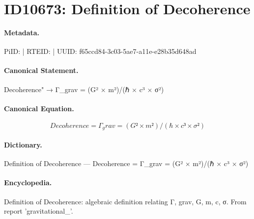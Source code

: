 \section*{ID10673: Definition of Decoherence}
\paragraph{Metadata.}
PiID:  | RTEID:  | UUID: f65ccd84-3c03-5ae7-a11e-e28b35d648ad

\paragraph{Canonical Statement.}
Decoherence" → Γ\_grav = (G² × m²)/(ℏ × c³ × σ²)

\paragraph{Canonical Equation.}
\[
Decoherence = Γ_grav = (G² × m²)/(ℏ × c³ × σ²)
\]

\paragraph{Dictionary.}
Definition of Decoherence — Decoherence = Γ\_grav = (G² × m²)/(ℏ × c³ × σ²)

\paragraph{Encyclopedia.}
Definition of Decoherence: algebraic definition relating Γ, grav, G, m, c, σ. From report 'gravitational\_'.
